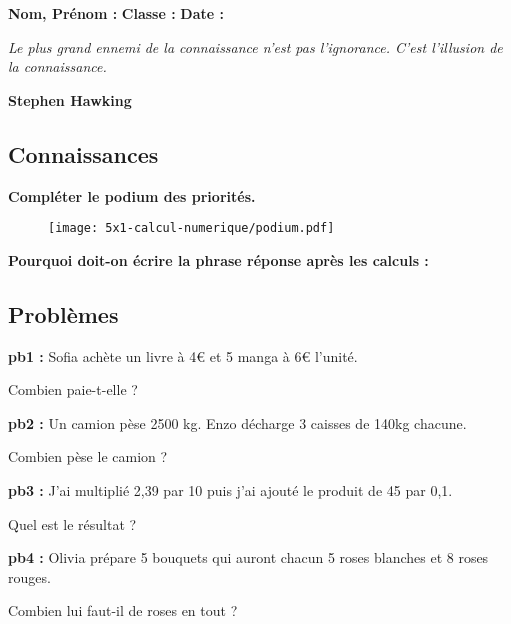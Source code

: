 



\textbf{Nom, Prénom :} \hspace{8cm} \textbf{Classe :} \hspace{3cm} \textbf{Date :}\\

\begin{center}
  \textit{Le plus grand ennemi de la connaissance n'est pas l'ignorance. C'est l'illusion de la connaissance.} 
  
  \textbf{Stephen Hawking}
\end{center}

\subsection*{Connaissances} 

\textbf{Compléter le podium des priorités.} 
\begin{figure}[H]
  \centering
  \texttt{[image: 5x1-calcul-numerique/podium.pdf]}
\end{figure} 

\textbf{Pourquoi doit-on écrire la phrase réponse après les calculs :} \\ \Pointilles[2]


\subsection*{Problèmes}

\textbf{pb1 : }
Sofia achète un livre à 4€ et 5 manga à 6€ l'unité. 

Combien paie-t-elle ?  \\ \Pointilles[5]

\textbf{pb2 : }
Un camion pèse 2500 kg. Enzo décharge 3 caisses de 140kg chacune. 

Combien pèse le camion ? \\ \Pointilles[5] 

\textbf{pb3 : }
\og J'ai multiplié 2,39 par 10 puis j'ai ajouté le produit de 45 par 0,1.\fg 

Quel est le résultat ? \\ \Pointilles[5]

\textbf{pb4 : }
Olivia prépare 5 bouquets qui auront chacun 5 roses blanches et 8 roses rouges.

Combien lui faut-il de roses en tout ? \\ \Pointilles[5]

